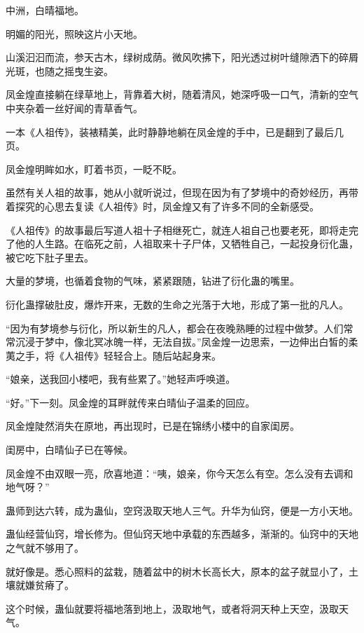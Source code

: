
\begin{this_body}

中洲，白晴福地。

明媚的阳光，照映这片小天地。

山溪汩汩而流，参天古木，绿树成荫。微风吹拂下，阳光透过树叶缝隙洒下的碎屑光斑，也随之摇曳生姿。

凤金煌直接躺在绿草地上，背靠着大树，随着清风，她深呼吸一口气，清新的空气中夹杂着一丝好闻的青草香气。

一本《人祖传》，装裱精美，此时静静地躺在凤金煌的手中，已是翻到了最后几页。

凤金煌明眸如水，盯着书页，一眨不眨。

虽然有关人祖的故事，她从小就听说过，但现在因为有了梦境中的奇妙经历，再带着探究的心思去复读《人祖传》时，凤金煌又有了许多不同的全新感受。

《人祖传》的故事最后写道人祖十子相继死亡，就连人祖自己也要老死，即将走完了他的人生路。在临死之前，人祖取来十子尸体，又牺牲自己，一起投身衍化蛊，被它吃下肚子里去。

大量的梦境，也循着食物的气味，紧紧跟随，钻进了衍化蛊的嘴里。

衍化蛊撑破肚皮，爆炸开来，无数的生命之光落于大地，形成了第一批的凡人。

“因为有梦境参与衍化，所以新生的凡人，都会在夜晚熟睡的过程中做梦。人们常常沉浸于梦中，像北冥冰魄一样，无法自拔。”凤金煌一边思索，一边伸出白皙的柔荑之手，将《人祖传》轻轻合上。随后站起身来。

“娘亲，送我回小楼吧，我有些累了。”她轻声呼唤道。

“好。”下一刻。凤金煌的耳畔就传来白晴仙子温柔的回应。

凤金煌陡然消失在原地，再出现时，已是在锦绣小楼中的自家闺房。

闺房中，白晴仙子已在等候。

凤金煌不由双眼一亮，欣喜地道：“咦，娘亲，你今天怎么有空。怎么没有去调和地气呀？”

蛊师到达六转，成为蛊仙，空窍汲取天地人三气。升华为仙窍，便是一方小天地。

蛊仙经营仙窍，增长修为。但仙窍天地中承载的东西越多，渐渐的。仙窍中的天地之气就不够用了。

就好像是。悉心照料的盆栽，随着盆中的树木长高长大，原本的盆子就显小了，土壤就嫌贫瘠了。

这个时候，蛊仙就要将福地落到地上，汲取地气，或者将洞天种上天空，汲取天气。


\end{this_body}
